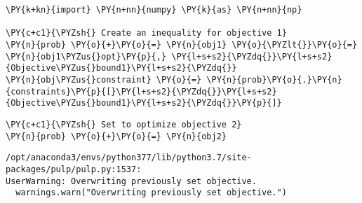     \begin{tcolorbox}[breakable, size=fbox, boxrule=1pt, pad at break*=1mm,colback=cellbackground, colframe=cellborder]
\begin{Verbatim}[commandchars=\\\{\}]
\PY{k+kn}{import} \PY{n+nn}{numpy} \PY{k}{as} \PY{n+nn}{np}

\PY{c+c1}{\PYZsh{} Create an inequality for objective 1}
\PY{n}{prob} \PY{o}{+}\PY{o}{=} \PY{n}{obj1} \PY{o}{\PYZlt{}}\PY{o}{=} \PY{n}{obj1\PYZus{}opt}\PY{p}{,} \PY{l+s+s2}{\PYZdq{}}\PY{l+s+s2}{Objective\PYZus{}bound1}\PY{l+s+s2}{\PYZdq{}}
\PY{n}{obj\PYZus{}constraint} \PY{o}{=} \PY{n}{prob}\PY{o}{.}\PY{n}{constraints}\PY{p}{[}\PY{l+s+s2}{\PYZdq{}}\PY{l+s+s2}{Objective\PYZus{}bound1}\PY{l+s+s2}{\PYZdq{}}\PY{p}{]}
\end{Verbatim}
\end{tcolorbox}

    \begin{tcolorbox}[breakable, size=fbox, boxrule=1pt, pad at break*=1mm,colback=cellbackground, colframe=cellborder]
\begin{Verbatim}[commandchars=\\\{\}]
\PY{c+c1}{\PYZsh{} Set to optimize objective 2}
\PY{n}{prob} \PY{o}{+}\PY{o}{=} \PY{n}{obj2}
\end{Verbatim}
\end{tcolorbox}

    \begin{Verbatim}[commandchars=\\\{\}]
/opt/anaconda3/envs/python377/lib/python3.7/site-packages/pulp/pulp.py:1537:
UserWarning: Overwriting previously set objective.
  warnings.warn("Overwriting previously set objective.")
    \end{Verbatim}


